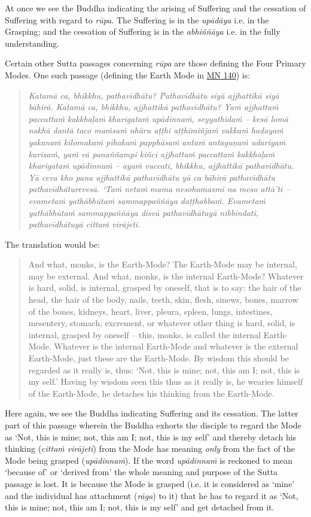 At once we see the Buddha indicating the arising of Suffering and the cessation of Suffering with regard to \textit{rūpa}. The Suffering is in the \textit{upādāya} i.e. in the Grasping; and the cessation of Suffering is in the \textit{abhiññāya} i.e. in the fully understanding.

Certain other Sutta passages concerning \textit{rūpa} are those defining the Four Primary Modes. One such passage (defining the Earth Mode in \href{https://suttacentral.net/mn140/en/bodhi}{MN 140}) is:

\begin{quote}
\textit{Katamā ca, bhikkhu, pathavīdhātu? Pathavīdhātu siyā ajjhattikā siyā bāhirā. Katamā ca, bhikkhu, ajjhattikā pathavīdhātu? Yaṁ ajjhattaṁ paccattaṁ kakkhaḷaṁ kharigataṁ upādinnaṁ, seyyathidaṁ -- kesā lomā nakhā dantā taco maṁsaṁ nhāru aṭṭhi aṭṭhimiñjaṁ vakkaṁ hadayaṁ yakanaṁ kilomakaṁ pihakaṁ papphāsaṁ antaṁ antaguṇaṁ udariyaṁ karīsaṁ, yaṁ vā panaññampi kiñci ajjhattaṁ paccattaṁ kakkhaḷaṁ kharigataṁ upādinnaṁ -- ayaṁ vuccati, bhikkhu, ajjhattikā pathavīdhātu. Yā ceva kho pana ajjhattikā pathavīdhātu yā ca bāhirā pathavīdhātu pathavīdhāturevesā. `Taṁ netaṁ mama nesohamasmi na meso attā'ti -- evametaṁ yathābhūtaṁ sammappaññāya daṭṭhabbaṁ. Evametaṁ yathābhūtaṁ sammappaññāya disvā pathavīdhātuyā nibbindati, pathavīdhātuyā cittaṁ virājeti.}
\end{quote}

The translation would be:

\begin{quote}
And what, monks, is the Earth-Mode? The Earth-Mode may be internal, may be external. And what, monks, is the internal Earth-Mode? Whatever is hard, solid, is internal, grasped by oneself, that is to say: the hair of the head, the hair of the body, nails, teeth, skin, flesh, sinews, bones, marrow of the bones, kidneys, heart, liver, pleura, spleen, lungs, intestines, mesentery, stomach, excrement, or whatever other thing is hard, solid, is internal, grasped by oneself -- this, monks, is called the internal Earth-Mode. Whatever is the internal Earth-Mode and whatever is the external Earth-Mode, just these are the Earth-Mode. By wisdom this should be regarded as it really is, thus: `Not, this is mine; not, this am I; not, this is my self.' Having by wisdom seen this thus as it really is, he wearies himself of the Earth-Mode, he detaches his thinking from the Earth-Mode.
\end{quote}

Here again, we see the Buddha indicating Suffering and its cessation. The latter part of this passage wherein the Buddha exhorts the disciple to regard the Mode as `Not, this is mine; not, this am I; not, this is my self' and thereby detach his thinking (\textit{cittaṁ virājeti}) from the Mode has meaning \emph{only} from the fact of the Mode being grasped (\textit{upādinnaṁ}). If the word \textit{upādinnaṁ} is reckoned to mean `because of' or `derived from' the whole meaning and purpose of the Sutta passage is lost. It is because the Mode is grasped (i.e. it is considered as `mine' and the individual has attachment (\textit{rāga}) to it) that he has to regard it as `Not, this is mine; not, this am I; not, this is my self' and get detached from it.

